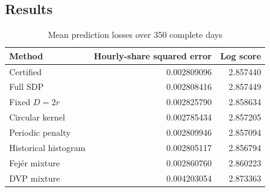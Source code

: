 \subsection{Results}
\begin{table}[htbp]
\centering
\caption{Mean prediction losses over 350 complete days}\label{tab:t6}
\small
\begin{tabular}{lrr}
\toprule
Method & Hourly-share squared error & Log score \\
\midrule
Certified & 0.002809096 & 2.857440 \\
Full SDP & 0.002808416 & 2.857449 \\
Fixed \(D=2r\) & 0.002825790 & 2.858634 \\
Circular kernel & 0.002785434 & 2.857205 \\
Periodic penalty & 0.002809946 & 2.857094 \\
Historical histogram & 0.002805117 & 2.856794 \\
Fejér mixture & 0.002860760 & 2.860223 \\
DVP mixture & 0.004203054 & 2.873363 \\
\bottomrule
\end{tabular}
\end{table}

